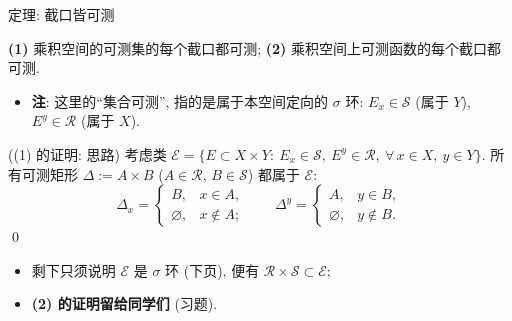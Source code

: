 \begin{frame}{定理: 截口皆可测}

\begin{thm}
\textbf{(1)} 乘积空间的可测集的每个截口都可测; \quad
\textbf{(2)} 乘积空间上可测函数的每个截口都可测.
\end{thm}

\begin{itemize}
\item \textbf{注}: 这里的``集合可测'', 指的是\alert{属于本空间定向的 $\sigma$ 环}:
  $E_x \in \mathscr{S}$ (属于 $Y$), $E^y \in \mathscr{R}$ (属于 $X$).
\end{itemize}

\pause

\startproof[bg=yellow, fg=red]((1) 的证明: 思路)
考虑类
$\mathcal{E} = \big\{ E \subset X \times Y:\ E_x \in \mathscr{S},\ E^y \in \mathscr{R},\ \forall\, x \in X,\ y \in Y \big\}$.
所有可测矩形 $\Delta := A \times B$ ($A \in \mathscr{R}$, $B \in \mathscr{S}$) 都属于 $\mathcal{E}$:
\[
\Delta_x =
\begin{cases}
B, & x \in A, \\
\varnothing, & x \notin A ;
\end{cases}
\qquad
\Delta^y =
\begin{cases}
A, & y \in B, \\
\varnothing, & y \notin B .
\end{cases}
\]
\qed

\pause

\begin{itemize}
\item 剩下只须说明 $\mathcal{E}$ 是 $\sigma$ 环 (下页), 便有
  $\mathscr{R} \times \mathscr{S} \subset \mathcal{E}$;
\item \textbf{(2) 的证明留给同学们} (习题).
\end{itemize}

\end{frame}


